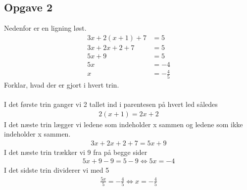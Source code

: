 \subsection{Opgave 2}

Nedenfor er en ligning løst.
\begin{align*}
    3x + 2(x+1) + 7 &= 5\\
    3x + 2x + 2 + 7 &= 5\\
    5x + 9 &= 5\\
    5x &= -4\\
    x &= -\frac{4}{5}
\end{align*}
Forklar, hvad der er gjort i hvert trin.\\\\

\ans
I det første trin ganger vi 2 tallet ind i parentesen på hvert led således 
\begin{align*}
    2(x + 1)=2x + 2
\end{align*}
I det næste trin lægger vi ledene som indeholder x sammen og ledene som ikke indeholder x sammen.
\begin{align*}
    3x + 2x +2 +7 = 5x + 9
\end{align*}
I det næste trin trækker vi 9 fra på begge sider
\begin{align*}
    5x + 9 - 9 = 5 - 9 \Longleftrightarrow 5x = -4
\end{align*}
I det sidste trin dividerer vi med 5 
\begin{align*}
    \frac{5x}{5} = -\frac{4}{5} \Longleftrightarrow x = -\frac{4}{5}
\end{align*}
